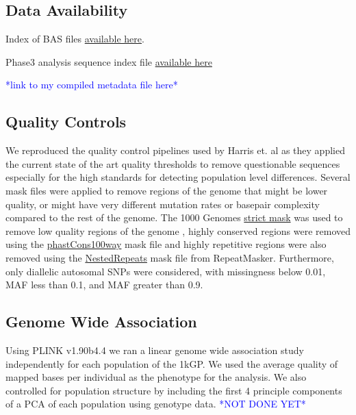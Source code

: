 \documentclass[9pt,lineno]{elife}
\newcommand{\todo}[1]{\textcolor{blue}{*#1*}}
\begin{document}
\subsection{Data Availability}

Index of BAS files \href{http://ftp.1000genomes.ebi.ac.uk/vol1/ftp/data_collections/1000_genomes_project/1000genomes.low_coverage.GRCh38DH.alignment.index}{available here}.

Phase3 analysis sequence index file  \href{http://ftp.1000genomes.ebi.ac.uk/vol1/ftp/phase3/20130502.phase3.analysis.sequence.index}{available here} 

\todo{link to my compiled metadata file here}

\subsection{Quality Controls}
We reproduced the quality control pipelines used by Harris et. al as they applied the current state of the art quality thresholds to remove questionable sequences especially for the high standards for detecting population level differences. 
Several mask files were applied to remove regions of the genome that might be lower quality, or might have very different mutation rates or basepair complexity compared to the rest of the genome. 
The  1000 Genomes \href{http://ftp.1000genomes.ebi.ac.uk/vol1/ftp/release/20130502/supporting/accessible_genome_masks/20141020.strict_mask.whole_genome.bed}{strict mask} was used to remove low quality regions of the genome , highly conserved regions were removed using the \href{http://hgdownload.cse.ucsc.edu/goldenPath/hg19/database/phastConsElements100way.txt.gz}{phastCons100way} mask file and highly repetitive regions were also removed using the \href{http://hgdownload.cse.ucsc.edu/goldenpath/hg19/database/nestedRepeats.txt.gz}{NestedRepeats} mask file from RepeatMasker. 
Furthermore, only diallelic autosomal SNPs were considered, with missingness below 0.01, MAF less than 0.1, and MAF greater than 0.9.

\subsection{Genome Wide Association}

Using PLINK v1.90b4.4 we ran a linear genome wide association study independently for each population of the 1kGP. We used the average quality of mapped bases per individual as the phenotype for the analysis. We also controlled for population structure by including the first 4 principle components of a PCA of each population using genotype data. \todo{NOT DONE YET}
\end{document}
